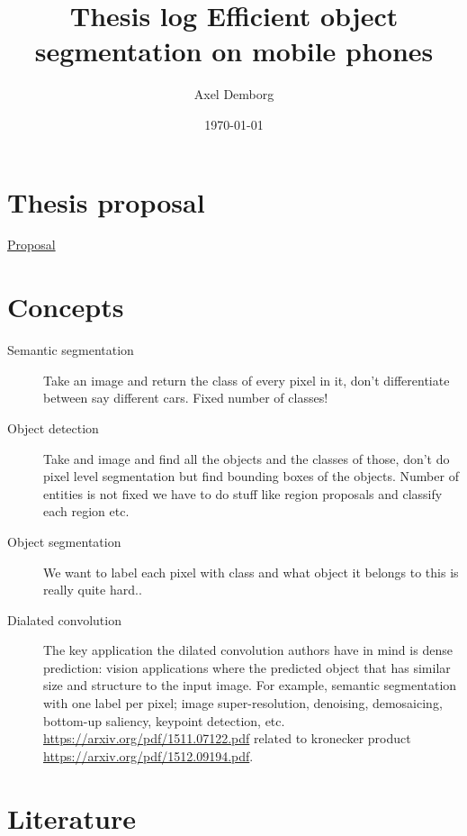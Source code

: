 \documentclass[11pt]{article}
\author{Axel Demborg}
\date{\today}
\title{Thesis log Efficient object segmentation on mobile phones}
\begin{document}
\maketitle
\tableofcontents




\section{Thesis proposal}
\label{sec:org10e7fd2}
\href{proposal.org}{Proposal}

\section{Concepts}
\label{sec:org199023c}
\begin{description}
\item[{Semantic segmentation}] Take an image and return the class of every pixel in it, don't differentiate between say different cars. Fixed number of classes!
\item[{Object detection}] Take and image and find all the objects and the classes of those, don't do pixel level segmentation but find bounding boxes of the objects. Number of entities is not fixed we have to do stuff like region proposals and classify each region etc.
\item[{Object segmentation}] We want to label each pixel with class and what object it belongs to this is really quite hard..
\item[{Dialated convolution}] The key application the dilated convolution authors have in mind is dense prediction: vision applications where the predicted object that has similar size and structure to the input image. For example, semantic segmentation with one label per pixel; image super-resolution, denoising, demosaicing, bottom-up saliency, keypoint detection, etc. \url{https://arxiv.org/pdf/1511.07122.pdf} related to kronecker product \url{https://arxiv.org/pdf/1512.09194.pdf}.
\end{description}

\section{Literature}
\label{sec:org91ae19f}
\end{document}
